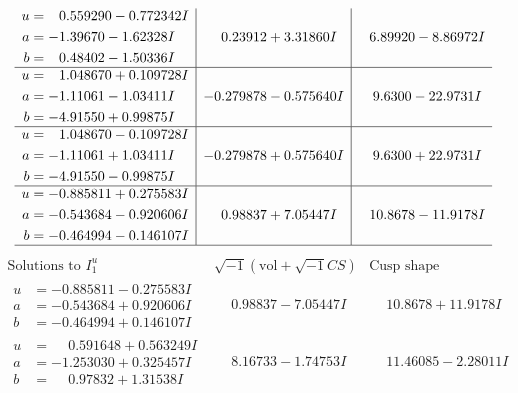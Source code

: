 \documentclass[1p]{elsarticle_modified}
\theoremstyle{definition}
\newcommand{\I}{\sqrt{-1}}
\begin{document}
$$\begin{array}{c|c|c}
\begin{aligned}
u &= \phantom{-}0.559290 - 0.772342 I \\
a &= -1.39670 - 1.62328 I \\
b &= \phantom{-}0.48402 - 1.50336 I\end{aligned}
 & \phantom{-}0.23912 + 3.31860 I & \phantom{-}6.89920 - 8.86972 I \\ \hline\begin{aligned}
u &= \phantom{-}1.048670 + 0.109728 I \\
a &= -1.11061 - 1.03411 I \\
b &= -4.91550 + 0.99875 I\end{aligned}
 & -0.279878 - 0.575640 I & \phantom{-}9.6300 - 22.9731 I \\ \hline\begin{aligned}
u &= \phantom{-}1.048670 - 0.109728 I \\
a &= -1.11061 + 1.03411 I \\
b &= -4.91550 - 0.99875 I\end{aligned}
 & -0.279878 + 0.575640 I & \phantom{-}9.6300 + 22.9731 I \\ \hline\begin{aligned}
u &= -0.885811 + 0.275583 I \\
a &= -0.543684 - 0.920606 I \\
b &= -0.464994 - 0.146107 I\end{aligned}
 & \phantom{-}0.98837 + 7.05447 I & \phantom{-}10.8678 - 11.9178 I\\
 \hline 
 \end{array}$$\newpage$$\begin{array}{c|c|c}  
\text{Solutions to }I^u_{1}& \I (\text{vol} + \sqrt{-1}CS) & \text{Cusp shape}\\
 \hline 
\begin{aligned}
u &= -0.885811 - 0.275583 I \\
a &= -0.543684 + 0.920606 I \\
b &= -0.464994 + 0.146107 I\end{aligned}
 & \phantom{-}0.98837 - 7.05447 I & \phantom{-}10.8678 + 11.9178 I \\ \hline\begin{aligned}
u &= \phantom{-}0.591648 + 0.563249 I \\
a &= -1.253030 + 0.325457 I \\
b &= \phantom{-}0.97832 + 1.31538 I\end{aligned}
 & \phantom{-}8.16733 - 1.74753 I & \phantom{-}11.46085 - 2.28011 I \\ \hline\begin{aligned}

\end{aligned}
\end{array}$$
\end{document}

